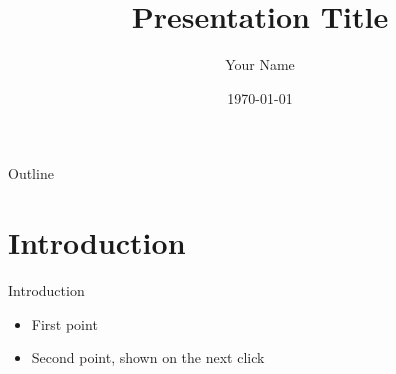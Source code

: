 \documentclass{beamer}
\title{Presentation Title}
\author{Your Name}
\date{\today}
\begin{document}
\begin{frame}
  \titlepage
\end{frame}

\begin{frame}{Outline}
  \tableofcontents
\end{frame}

\section{Introduction}
\begin{frame}{Introduction}
  \begin{itemize}
    \item First point
    \item<2-> Second point, shown on the next click
  \end{itemize}
\end{frame}
\end{document}
